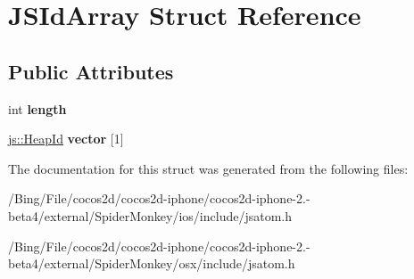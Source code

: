 \hypertarget{struct_j_s_id_array}{\section{J\-S\-Id\-Array Struct Reference}
\label{struct_j_s_id_array}
}
\subsection*{Public Attributes}
\begin{DoxyCompactItemize}
\item 
\hypertarget{struct_j_s_id_array_ab1c99582b275a2d4c517e54df6e10d0e}{int {\bfseries length}}\label{struct_j_s_id_array_ab1c99582b275a2d4c517e54df6e10d0e}

\item 
\hypertarget{struct_j_s_id_array_a1f44f9bfdbd766a722c22216c0195995}{\hyperlink{classjs_1_1_heap_id}{js\-::\-Heap\-Id} {\bfseries vector} \mbox{[}1\mbox{]}}\label{struct_j_s_id_array_a1f44f9bfdbd766a722c22216c0195995}

\end{DoxyCompactItemize}


The documentation for this struct was generated from the following files\-:\begin{DoxyCompactItemize}
\item 
/\-Bing/\-File/cocos2d/cocos2d-\/iphone/cocos2d-\/iphone-\/2.-\/beta4/external/\-Spider\-Monkey/ios/include/jsatom.\-h\item 
/\-Bing/\-File/cocos2d/cocos2d-\/iphone/cocos2d-\/iphone-\/2.-\/beta4/external/\-Spider\-Monkey/osx/include/jsatom.\-h\end{DoxyCompactItemize}
